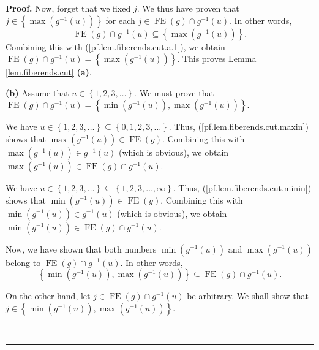 \documentclass[numbers=enddot,12pt,final,onecolumn,notitlepage]{scrartcl}%
\theoremstyle{definition}
\newenvironment{proof}[1][Proof]{\noindent\textbf{#1.} }{\ \rule{0.5em}{0.5em}}
\newenvironment{verlong}{}{}
\begin{document}
\begin{verlong}
\begin{proof}
Now, forget that we fixed $j$. We thus have proven that $j\in\left\{
\max\left(  g^{-1}\left(  u\right)  \right)  \right\}  $ for each
$j\in\operatorname*{FE}\left(  g\right)  \cap g^{-1}\left(  u\right)  $. In
other words,%
\[
\operatorname*{FE}\left(  g\right)  \cap g^{-1}\left(  u\right)
\subseteq\left\{  \max\left(  g^{-1}\left(  u\right)  \right)  \right\}  .
\]
Combining this with (\ref{pf.lem.fiberends.cut.a.1}), we obtain
$\operatorname*{FE}\left(  g\right)  \cap g^{-1}\left(  u\right)  =\left\{
\max\left(  g^{-1}\left(  u\right)  \right)  \right\}  $. This proves Lemma
\ref{lem.fiberends.cut} \textbf{(a)}.

\textbf{(b)} Assume that $u\in\left\{  1,2,3,\ldots\right\}  $. We must prove
that $\operatorname*{FE}\left(  g\right)  \cap g^{-1}\left(  u\right)
=\left\{  \min\left(  g^{-1}\left(  u\right)  \right)  ,\max\left(
g^{-1}\left(  u\right)  \right)  \right\}  $.

We have $u\in\left\{  1,2,3,\ldots\right\}  \subseteq\left\{  0,1,2,3,\ldots
\right\}  $. Thus, (\ref{pf.lem.fiberends.cut.maxin}) shows that $\max\left(
g^{-1}\left(  u\right)  \right)  \in\operatorname*{FE}\left(  g\right)  $.
Combining this with $\max\left(  g^{-1}\left(  u\right)  \right)  \in
g^{-1}\left(  u\right)  $ (which is obvious), we obtain $\max\left(
g^{-1}\left(  u\right)  \right)  \in\operatorname*{FE}\left(  g\right)  \cap
g^{-1}\left(  u\right)  $.

We have $u\in\left\{  1,2,3,\ldots\right\}  \subseteq\left\{  1,2,3,\ldots
,\infty\right\}  $. Thus, (\ref{pf.lem.fiberends.cut.minin}) shows that
$\min\left(  g^{-1}\left(  u\right)  \right)  \in\operatorname*{FE}\left(
g\right)  $. Combining this with $\min\left(  g^{-1}\left(  u\right)  \right)
\in g^{-1}\left(  u\right)  $ (which is obvious), we obtain $\min\left(
g^{-1}\left(  u\right)  \right)  \in\operatorname*{FE}\left(  g\right)  \cap
g^{-1}\left(  u\right)  $.

Now, we have shown that both numbers $\min\left(  g^{-1}\left(  u\right)
\right)  $ and $\max\left(  g^{-1}\left(  u\right)  \right)  $ belong to
$\operatorname*{FE}\left(  g\right)  \cap g^{-1}\left(  u\right)  $. In other
words,%
\begin{equation}
\left\{  \min\left(  g^{-1}\left(  u\right)  \right)  ,\max\left(
g^{-1}\left(  u\right)  \right)  \right\}  \subseteq\operatorname*{FE}\left(
g\right)  \cap g^{-1}\left(  u\right)  . \label{pf.lem.fiberends.cut.b.1}%
\end{equation}


On the other hand, let $j\in\operatorname*{FE}\left(  g\right)  \cap
g^{-1}\left(  u\right)  $ be arbitrary. We shall show that $j\in\left\{
\min\left(  g^{-1}\left(  u\right)  \right)  ,\max\left(  g^{-1}\left(
u\right)  \right)  \right\}  $.


\end{proof}
\end{verlong}
\end{document}
